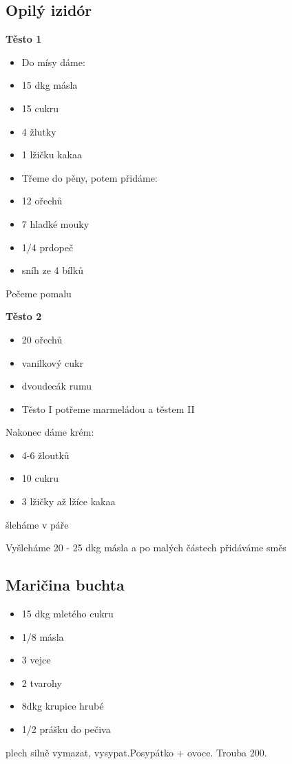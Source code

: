 \documentclass[10pt,a4paper]{article}
\newenvironment{myitemize}
{ \begin{itemize}
    \setlength{\itemsep}{0pt}
    \setlength{\parskip}{0pt}
    \setlength{\parsep}{0pt}     }
{ \end{itemize}                  }
\begin{document}
\subsection{Opilý izidór}
\begin{minipage}[t]{0,5\textwidth}
\textbf{Těsto 1}
\begin{myitemize} 
\item Do mísy dáme:
\item 15 dkg másla 
\item 15 cukru
\item 4 žlutky
\item 1 lžičku kakaa
\item Třeme do pěny,  potem přidáme:
\item 12 ořechů
\item 7 hladké mouky
\item 1/4 prdopeč
\item sníh ze 4 bílků
\end{myitemize}
Pečeme pomalu 
\end{minipage}
\begin{minipage}[t]{0,5\textwidth}
\textbf{Těsto 2}
\begin{myitemize} 
\item 20 ořechů
\item vanilkový cukr
\item dvoudecák rumu
\item Těsto I potřeme marmeládou a těstem II
\end{myitemize}
Nakonec dáme krém:
\begin{myitemize} 
\item 4-6 žloutků 
\item 10 cukru
\item 3 lžičky až lžíce kakaa
\end{myitemize}
šleháme v páře

Vyšleháme 20 - 25 dkg másla a po malých částech přidáváme směs
\end{minipage}
\subsection{Maričina buchta}
\begin{minipage}[t]{0,5\textwidth}
\begin{myitemize} 
\item 15 dkg mletého cukru
\item 1/8 másla
\item 3 vejce
\item 2 tvarohy
\item 8dkg krupice hrubé
\item 1/2 prášku do pečiva
\end{myitemize}
\end{minipage}
\begin{minipage}[t]{0,5\textwidth}
plech silně vymazat, vysypat.Posypátko + ovoce. Trouba 200.
\end{minipage}
\end{document}

